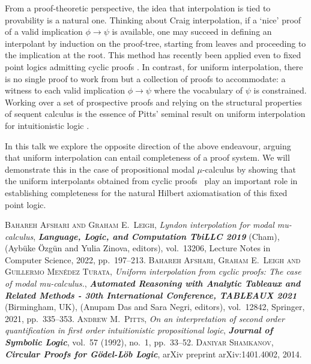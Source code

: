 \documentclass[bsl,meeting]{asl}
\newcommand{\NP}{}
\begin{document}
\thispagestyle{empty}



\NP  
{}


From a proof-theoretic perspective, the idea that interpolation is tied to provability is a natural one. Thinking about Craig interpolation, if a `nice' proof of a valid implication $\phi\to\psi$ is available, one may succeed in defining an interpolant by induction on the proof-tree, starting from  leaves and proceeding to the implication at the root.
This method has recently been applied even to fixed point logics admitting cyclic proofs \cite{AL22,Sham14}.
In contrast, for uniform interpolation, there is no single proof to work from but a collection of proofs to accommodate:  a witness to each valid implication $\phi\to\psi$ where the vocabulary of $\psi$ is constrained. Working over a set of prospective proofs and relying on the structural properties of sequent calculus is the essence of Pitts' seminal result on uniform interpolation for intuitionistic logic \cite{Pitts92}.

In this talk we explore the opposite direction of the above endeavour, arguing that uniform interpolation can entail completeness of a proof system.
We will demonstrate this in the case of propositional modal $\mu$-calculus by showing that the uniform interpolants obtained from cyclic proofs~\cite{ALM21} play an important role in establishing completeness  for the natural Hilbert axiomatisation of this fixed point logic.

\begin{thebibliography}{10}
%
{\scshape Bahareh Afshari and Graham E.~Leigh},
{\itshape Lyndon interpolation for modal mu-calculus},
{\bfseries\itshape Language, Logic, and Computation {TbiLLC }2019}
(Cham),
(Ayb{\"u}ke {\"O}zg{\"u}n
and Yulia Zinova, editors),
vol.~13206,
Lecture Notes in Computer Science,
2022,
pp.~197--213.
%
{\scshape Bahareh Afshari, Graham E.~Leigh and Guillermo Men\'edez Turata},
{\itshape Uniform interpolation from cyclic proofs: The case of modal mu-calculus.},
{\bfseries\itshape Automated Reasoning with Analytic Tableaux and Related Methods - 30th International Conference, {TABLEAUX} 2021}
(Birmingham, UK),
(Anupam Das and Sara Negri, editors),
vol.~12842,
Springer,
2021,
pp.~335--353.
%
{\scshape Andrew M.~Pitts},
{\itshape On an interpretation of second order quantification in first order intuitionistic propositional logic},
{\bfseries\itshape Journal of Symbolic Logic},
vol.~57 (1992), no.~1, pp.~33--52.
%
{\scshape Daniyar Shamkanov},
{\bfseries\itshape Circular Proofs for {G}\"odel-{L}\"ob Logic},
arXiv preprint arXiv:1401.4002,
2014.
\end{thebibliography}
\vspace*{-0.5\baselineskip}
\end{document}
